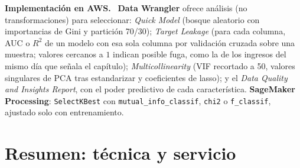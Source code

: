 \documentclass[11pt,a4paper]{article}
\theoremstyle{plain}
\theoremstyle{definition}
\theoremstyle{remark}
\newcommand{\1}{\mathbf{1}}
\newenvironment{aws}{\par\medskip\sloppy\noindent\textbf{Implementación en AWS.}\ }{\par\medskip}
\begin{document}
\begin{aws}
\textbf{Data Wrangler} ofrece análisis (no transformaciones) para
seleccionar: \emph{Quick Model} (bosque aleatorio con importancias de
Gini y partición 70/30); \emph{Target Leakage} (para cada columna, AUC o
$R^2$ de un modelo con esa sola columna por validación cruzada sobre una
muestra; valores cercanos a $1$ indican posible fuga, como la de los
ingresos del mismo día que señala el capítulo); \emph{Multicollinearity}
(VIF recortado a 50, valores singulares de PCA tras estandarizar y
coeficientes de lasso); y el \emph{Data Quality and Insights Report}, con
el poder predictivo de cada característica. \textbf{SageMaker Processing}:
\texttt{SelectKBest} con \texttt{mutual\_info\_classif}, \texttt{chi2} o
\texttt{f\_classif}, ajustado solo con entrenamiento.
\end{aws}

\section{Resumen: técnica y servicio}
\end{document}
